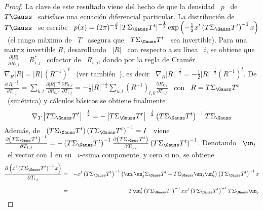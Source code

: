 \begin{proof}
  La clave de este resultado viene del hecho  de que la densidad \ $p$ \ de \ $T
  \Gauss$ \ satisface una  ecuaci\'on diferencial particular.  La distribuci\'on
  de  \ $T  \Gauss$  \ se  escribe \  $p(x)  = (2  \pi)^{-\frac{d}{2}} \left|  T
    \Sigma_\Gauss  T^t  \right|^{-\frac12} \exp\left(  -  \frac12  x^t \left(  T
      \Sigma_\Gauss T^t \right)^{-1} x \right)$ \  (el rango m\'aximo de \ $T$ \
  asegura  que \  $T  \Sigma_\Gauss T^t$  \  sea invertible).   Para una  matriz
  invertible $R$,  desarollando \ $|R|$  \ con respecto  a su l\'inea \  $i$, se
  obtiene que  \ $\frac{\partial |R|}{\partial R_{i,j}} =  R_{i,j}^*$ \ cofactor
  de \ $R_{i,j}$, dando por la regla de Cram\'er \ $\nabla_R |R| = |R| \, \left(
    R^{-1} \right)^t$ \ (ver tambi\'en~\cite[cap.~1~\&~9]{MagNeu99}), es decir \
  $\nabla_R |R|^{-\frac12}  = -\frac12 |R|^{-\frac12}  \left( R^{-1} \right)^t$.
  De    $\frac{\partial   |R|^{-\frac12}}{\partial    T_{i,j}}    =   \sum_{k,l}
  \frac{\partial      |R|^{-\frac12}}{\partial      R_{k,l}}      \frac{\partial
    R_{k,l}}{\partial  T_{i,j}}  =  -\frac12  |R|^{-\frac12}  \sum_{k,l}  \left(
    R^{-1} \right)_{l,k} \frac{\partial R_{k,l}}{\partial T_{i,j}}$ \ con \ $R =
  T  \Sigma_\Gauss  T^t$  \  (sim\'etrica)  y c\'alculos  b\'asicos  se  obtiene
  finalmente
  \[
  \nabla_T  \left|   T  \Sigma_\Gauss  T^t  \right|^{-\frac12}  =   -  \left|  T
    \Sigma_\Gauss T^t \right|^{-\frac12} \left( T \Sigma_\Gauss T^t \right)^{-1}
  T \Sigma_\Gauss
  \]
  Adem\'as, de \ $\left( T  \Sigma_\Gauss T^t \right) \left( T \Sigma_\Gauss T^t
  \right)^{-1}  =  I$ \  viene  \  $\frac{\partial  \left( T  \Sigma_\Gauss  T^t
    \right)^{-1}}{\partial T_{i,j}} = -  \left( T \Sigma_\Gauss T^t \right)^{-1}
  \frac{\partial \left( T \Sigma_\Gauss  T^t \right)}{\partial T_{i,j}} \left( T
    \Sigma_\Gauss T^t \right)^{-1}$. Denotando \ $\un_i$ \ el vector con 1 en su
  \ $i$-esima componente, y cero si no, se obtiene
  \begin{eqnarray*}
  \frac{\partial \left( x^t \left( T \Sigma_\Gauss T^t \right)^{-1} x
  \right)}{\partial T_{i,j}} & = & - x^t \left( T \Sigma_\Gauss T^t \right)^{-1}
  \left( \un_i \un_j^t \Sigma_\Gauss T^t + T \Sigma_\Gauss \un_j \un_i^t \right) \left( T
  \Sigma_\Gauss T^t \right)^{-1} x\\[2.5mm]
  & = & - 2 \, \un_i^t \left( T \Sigma_\Gauss T^t \right)^{-1} x x^t \left( T
  \Sigma_\Gauss T^t \right)^{-1} T \Sigma_\Gauss \un_j
  \end{eqnarray*}

\end{proof}
